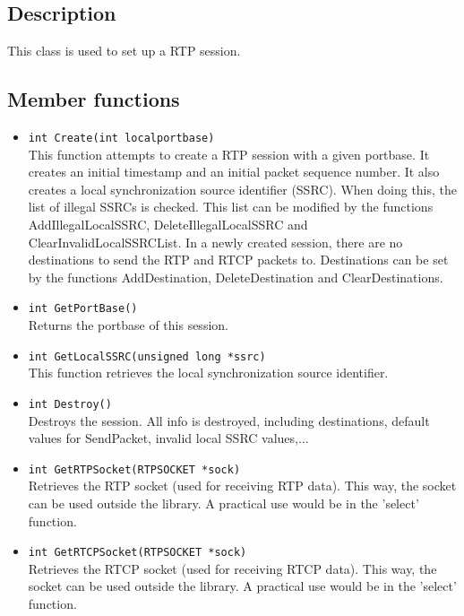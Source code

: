 \subsection{Description}

This class is used to set up a RTP session.

\subsection{Member functions}

\begin{itemize}
\item {\tt int Create(int localportbase)}\\
	This function attempts to create a RTP session with a given portbase.
	It creates an initial timestamp and an initial packet sequence
	number. It also creates a local synchronization source identifier
	(SSRC). When doing this, the list of illegal SSRCs is checked. This
	list can be modified by the functions AddIllegalLocalSSRC,
	DeleteIllegalLocalSSRC and ClearInvalidLocalSSRCList. In a newly
	created session, there are no destinations to send the RTP and RTCP
	packets to. Destinations can be set by the functions AddDestination,
	DeleteDestination and ClearDestinations.

\item {\tt int GetPortBase()}\\
	Returns the portbase of this session.

\item {\tt int GetLocalSSRC(unsigned long *ssrc)}\\
	This function retrieves the local synchronization source identifier.

\item {\tt int Destroy()}\\
	Destroys the session. All info is destroyed, including destinations,
	default values for SendPacket, invalid local SSRC values,...	

\item {\tt int GetRTPSocket(RTPSOCKET *sock)}\\
	Retrieves the RTP socket (used for receiving RTP data). This way,
	the socket can be used outside the library. A practical use would be
	in the 'select' function.

\item {\tt int GetRTCPSocket(RTPSOCKET *sock)}\\
	Retrieves the RTCP socket (used for receiving RTCP data). This way,
	the socket can be used outside the library. A practical use would
	be in the 'select' function.


\end{itemize}
